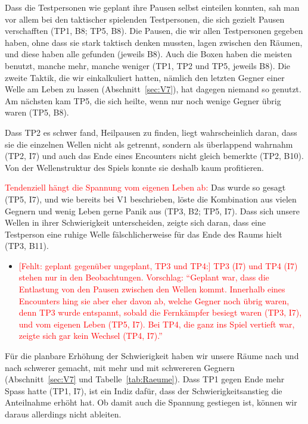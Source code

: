 \documentclass[../Main.tex]{subfiles}
\begin{document}
Dass die Testpersonen wie geplant ihre Pausen selbst einteilen konnten, sah man vor allem bei den taktischer spielenden Testpersonen, die sich gezielt Pausen verschafften (TP1, B8; TP5, B8). Die Pausen, die wir allen Testpersonen gegeben haben, ohne dass sie stark taktisch denken mussten, lagen zwischen den Räumen, und diese haben alle gefunden (jeweils B8). Auch die Boxen haben die meisten benutzt, manche mehr, manche weniger (TP1, TP2 und TP5, jeweils B8). Die zweite Taktik, die wir einkalkuliert hatten, nämlich den letzten Gegner einer Welle am Leben zu lassen (Abschnitt~\ref{sec:V7}), hat dagegen niemand so genutzt. Am nächsten kam TP5, die sich heilte, wenn nur noch wenige Gegner übrig waren (TP5, B8).

Dass TP2 es schwer fand, Heilpausen zu finden, liegt wahrscheinlich daran, dass sie die einzelnen Wellen nicht als getrennt, sondern als überlappend wahrnahm (TP2, I7) und auch das Ende eines Encounters nicht gleich bemerkte (TP2, B10). Von der Wellenstruktur des Spiels konnte sie deshalb kaum profitieren.

\textcolor{red}{Tendenziell hängt die Spannung vom eigenen Leben ab:} Das wurde so gesagt (TP5, I7), und wie bereits bei V1 beschrieben, löste die Kombination aus vielen Gegnern und wenig Leben gerne Panik aus (TP3, B2; TP5, I7). Dass sich unsere Wellen in ihrer Schwierigkeit unterscheiden, zeigte sich daran, dass eine Testperson eine ruhige Welle fälschlicherweise für das Ende des Raums hielt (TP3, B11).

\begin{itemize}[leftmargin=1.5cm]
    \item \textcolor{red}{[Fehlt: geplant gegenüber ungeplant, TP3 und TP4:] TP3 (I7) und TP4 (I7) stehen nur in den Beobachtungen. Vorschlag: \enquote{Geplant war, dass die Entlastung von den Pausen zwischen den Wellen kommt. Innerhalb eines Encounters hing sie aber eher davon ab, welche Gegner noch übrig waren, denn TP3 wurde entspannt, sobald die Fernkämpfer besiegt waren (TP3, I7), und vom eigenen Leben (TP5, I7). Bei TP4, die ganz ins Spiel vertieft war, zeigte sich gar kein Wechsel (TP4, I7).}}
\end{itemize}

Für die planbare Erhöhung der Schwierigkeit haben wir unsere Räume nach und nach schwerer gemacht, mit mehr und mit schwereren Gegnern (Abschnitt~\ref{sec:V7} und Tabelle~\ref{tab:Raeume}). Dass TP1 gegen Ende mehr Spass hatte (TP1, I7), ist ein Indiz dafür, dass der Schwierigkeitsanstieg die Anteilnahme erhöht hat. Ob damit auch die Spannung gestiegen ist, können wir daraus allerdings nicht ableiten.
\end{document}

